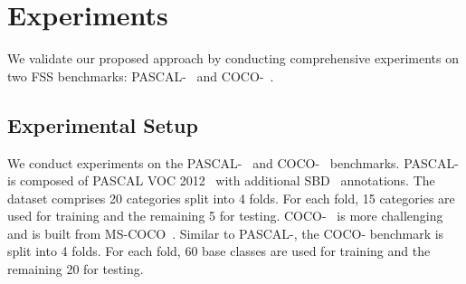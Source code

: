 

\section{Experiments}
We validate our proposed approach by conducting comprehensive experiments on two FSS benchmarks: PASCAL-~\cite{Shaban2017} and COCO-~\cite{Nguyen2019}.

\subsection{Experimental Setup}\label{sec:exptsetup}
We conduct experiments on the PASCAL-~\cite{Shaban2017} and COCO-~\cite{Nguyen2019} benchmarks. PASCAL- is composed of PASCAL VOC 2012~\cite{Everingham2010} with additional SBD~\cite{Hariharan2011} annotations. The dataset comprises 20 categories split into 4 folds. For each fold, 15 categories are used for training and the remaining 5 for testing. COCO-~\cite{Nguyen2019} is more challenging and is built from MS-COCO~\cite{Lin2014}. Similar to PASCAL-, the COCO- benchmark is split into 4 folds. For each fold, 60 base classes are used for training and the remaining 20 for testing. 

